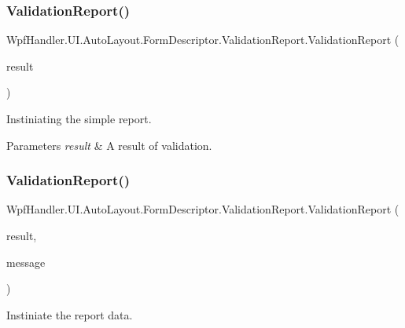 \subsubsection{\texorpdfstring{Validation\+Report()}{ValidationReport()}\hspace{0.1cm}{\footnotesize\ttfamily [1/2]}}
{\footnotesize\ttfamily Wpf\+Handler.\+U\+I.\+Auto\+Layout.\+Form\+Descriptor.\+Validation\+Report.\+Validation\+Report (\begin{DoxyParamCaption}\item[{bool}]{result }\end{DoxyParamCaption})}



Instiniating the simple report. 


\begin{DoxyParams}{Parameters}
{\em result} & A result of validation.\\
\hline
\end{DoxyParams}
\mbox{\label{struct_wpf_handler_1_1_u_i_1_1_auto_layout_1_1_form_descriptor_1_1_validation_report_ae484c3444567552ac38a1211c12d60c7}} 
\subsubsection{\texorpdfstring{Validation\+Report()}{ValidationReport()}\hspace{0.1cm}{\footnotesize\ttfamily [2/2]}}
{\footnotesize\ttfamily Wpf\+Handler.\+U\+I.\+Auto\+Layout.\+Form\+Descriptor.\+Validation\+Report.\+Validation\+Report (\begin{DoxyParamCaption}\item[{bool}]{result,  }\item[{\mbox{\hyperlink{class_wpf_handler_1_1_u_i_1_1_g_u_i_content}{G\+U\+I\+Content}}}]{message }\end{DoxyParamCaption})}



Instiniate the report data. 


